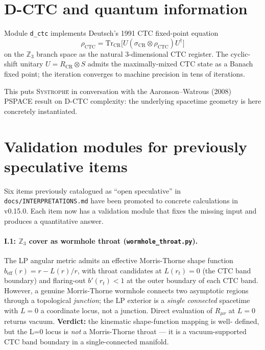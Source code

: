 \documentclass[11pt,a4paper]{article}
\begin{document}
\section{D-CTC and quantum information}

Module \texttt{d\_ctc} implements Deutsch's 1991 CTC fixed-point
equation
\begin{equation}
\rho_{\text{CTC}} = \text{Tr}_{\text{CR}}
  \big[ U (\sigma_{\text{CR}} \otimes \rho_{\text{CTC}}) U^\dagger \big]
\end{equation}
on the $\mathbb{Z}_3$ branch space as the natural 3-dimensional
CTC register. The cyclic-shift unitary
$U = R_{\text{CR}} \otimes S$ admits the maximally-mixed CTC state
as a Banach fixed point; the iteration converges to machine
precision in tens of iterations.

This puts \textsc{Systroph\=e} in conversation with the
Aaronson--Watrous (2008) PSPACE result on D-CTC complexity: the
underlying spacetime geometry is here concretely instantiated.

\section{Validation modules for previously speculative items}

Six items previously catalogued as ``open speculative'' in
\texttt{docs/INTERPRETATIONS.md} have been promoted to concrete
calculations in v0.15.0. Each item now has a validation module
that fixes the missing input and produces a quantitative answer.

\paragraph{I.1: $\mathbb{Z}_3$ cover as wormhole throat
(\texttt{wormhole\_throat.py}).} The LP angular metric admits an
effective Morris-Thorne shape function $b_{\text{eff}}(r) = r - L(r)/r$,
with throat candidates at $L(r_t) = 0$ (the CTC band boundary) and
flaring-out $b'(r_t) < 1$ at the outer boundary of each CTC band.
However, a genuine Morris-Thorne wormhole connects two asymptotic
regions through a topological \emph{junction}; the LP exterior is a
\emph{single connected} spacetime with $L = 0$ a coordinate locus,
not a junction. Direct evaluation of $R_{\mu\nu}$ at $L = 0$
returns vacuum.
\textbf{Verdict:} the kinematic shape-function mapping is well-
defined, but the L=0 locus is \emph{not} a Morris-Thorne throat ---
it is a vacuum-supported CTC band boundary in a single-connected
manifold.
\end{document}
